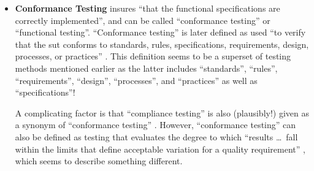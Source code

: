 \begin{itemize}
      \item \textbf{Conformance Testing}
            \citet[p.~5-7]{SWEBOK2024} insures ``that the functional
            specifications are correctly implemented'', and can be called
            ``conformance testing'' or ``functional testing''.
            ``Conformance testing'' is later defined as used ``to
            verify that the \acs{sut} conforms to standards, rules,
            specifications, requirements, design, processes, or practices''
            \citep[p.~5-7]{SWEBOK2024}. This definition seems to be a superset
            of testing methods mentioned earlier as the latter includes ``standards'',
            ``rules'', ``requirements'', ``design'', ``processes'', and
            ``practices'' as well as ``specifications''!

            A complicating factor is that ``compliance testing'' is also
            (plausibly!) given as a synonym of ``conformance testing''
            \citep[p.~43]{Kam2008}. However, ``conformance
            testing'' can also be defined as testing that evaluates the degree
            to which ``results \dots\ fall within the limits that define
            acceptable variation for a quality requirement''
            \citep[p.~93]{IEEE2017}, which seems to
            describe something different.



\end{itemize}
